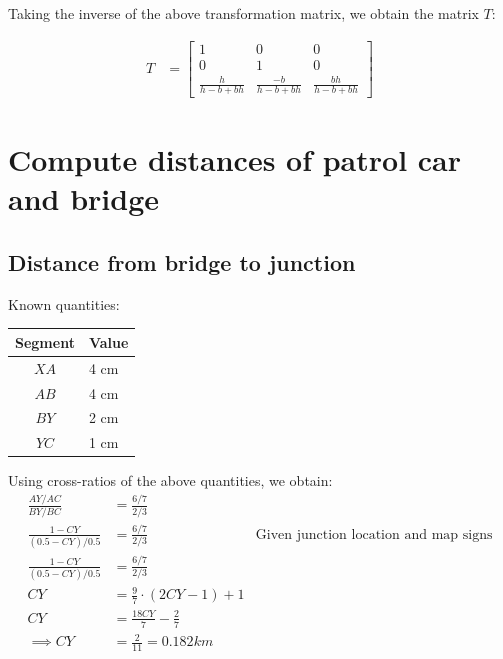 \documentclass[12pt, oneside]{article}
\begin{document}
Taking the inverse of the above transformation matrix, we obtain the matrix $T$:

\begin{align*}
    T &=
    \begin{bmatrix}
      1             &  0   & 0 \\
      0             &  1   & 0 \\
      \frac{h}{h - b + bh}      &  
      \frac{-b}{h - b + bh}     & 
      \frac{bh}{h - b + bh}
      \end{bmatrix}
\end{align*}

\clearpage
\section{Compute distances of patrol car and bridge}

\subsection{Distance from bridge to junction}

Known quantities:

\begin{table}[H]
\centering
\begin{tabular}{|c|l|}
\hline
\textbf{Segment} & \textbf{Value}  \\ \hline
$XA$      & 4 cm     \\ \hline
$AB$      & 4 cm     \\ \hline
$BY$      & 2 cm     \\ \hline 
$YC$      & 1 cm     \\ \hline
\end{tabular}
\end{table}

Using cross-ratios of the above quantities, we obtain:
\begin{align*}
    \frac{AY/AC}{BY/BC}  &= \frac{6/7}{2/3} \\ 
    \frac{1-CY}{(0.5-CY)/0.5}  &= \frac{6/7}{2/3} &\text{Given  
                                junction location and map signs}  \\ 
    \frac{1-CY}{(0.5-CY)/0.5}  &= \frac{6/7}{2/3} \\ 
    CY  &= \frac{9}{7} \cdot (2CY - 1) + 1  \\ 
    CY  &= \frac{18 CY}{7} - \frac{2}{7} \\
    \implies CY &=  \frac{2}{11} = 0.182 km 
\end{align*}
\end{document}
